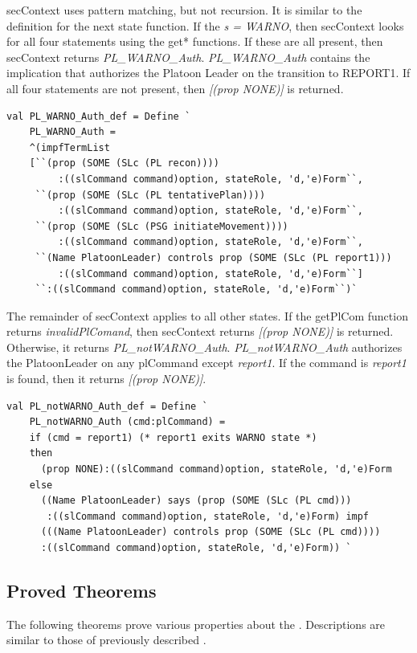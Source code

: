 \documentclass[../../main/main.tex]{subfiles}
\begin{document}
secContext uses pattern matching, but not recursion. It is similar to the definition for the next state function.  If the \textit{s = WARNO}, then secContext looks for all four statements using the get* functions.   If these are all present, then secContext returns \textit{PL_WARNO_Auth}. \textit{PL_WARNO_Auth} contains the implication that authorizes the Platoon Leader on the transition to REPORT1.  If all four statements are not present, then \textit{ [(prop NONE)]} is returned.


\begin{lstlisting}
val PL_WARNO_Auth_def = Define `
    PL_WARNO_Auth =
    ^(impfTermList
    [``(prop (SOME (SLc (PL recon))))
         :((slCommand command)option, stateRole, 'd,'e)Form``,
     ``(prop (SOME (SLc (PL tentativePlan))))
         :((slCommand command)option, stateRole, 'd,'e)Form``,
     ``(prop (SOME (SLc (PSG initiateMovement))))
         :((slCommand command)option, stateRole, 'd,'e)Form``,
     ``(Name PlatoonLeader) controls prop (SOME (SLc (PL report1)))
         :((slCommand command)option, stateRole, 'd,'e)Form``]
     ``:((slCommand command)option, stateRole, 'd,'e)Form``)`
\end{lstlisting}

The remainder of secContext applies to all other states.  If the getPlCom function returns \textit{invalidPlComand}, then secContext returns  \textit{ [(prop NONE)]} is returned.  Otherwise, it returns \textit{PL_notWARNO_Auth}.  \textit{PL_notWARNO_Auth} authorizes the PlatoonLeader on any plCommand except \textit{report1}. If the command is \textit{report1} is found, then it returns \textit{ [(prop NONE)]}.

\begin{lstlisting}
val PL_notWARNO_Auth_def = Define `
    PL_notWARNO_Auth (cmd:plCommand) =
    if (cmd = report1) (* report1 exits WARNO state *)
    then
      (prop NONE):((slCommand command)option, stateRole, 'd,'e)Form
    else
      ((Name PlatoonLeader) says (prop (SOME (SLc (PL cmd)))
       :((slCommand command)option, stateRole, 'd,'e)Form) impf
      (((Name PlatoonLeader) controls prop (SOME (SLc (PL cmd))))
      :((slCommand command)option, stateRole, 'd,'e)Form)) `
\end{lstlisting}

\subsection{Proved Theorems}
The following theorems prove various properties about the .  Descriptions are similar to those of previously described .  
\end{document}

